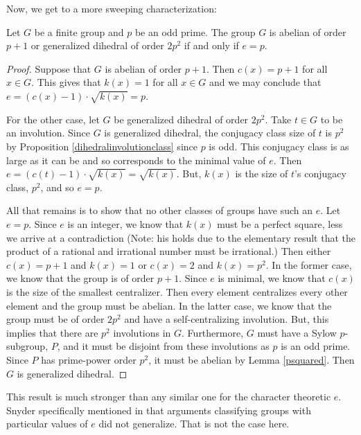 \documentclass[main.tex]{subfiles}
\begin{document}
Now, we get to a more sweeping characterization:

\begin{theorem}
Let $G$ be a finite group and $p$ be an odd prime. The group $G$ is abelian of order $p+1$ or generalized dihedral of order $2p^2$ if and only if $e = p$.
\end{theorem}

\begin{proof}
Suppose that $G$ is abelian of order $p+1$. Then $c(x) = p+1$ for all $x \in G$. This gives that $k(x) = 1$ for all $x \in G$ and we may conclude that $e = (c(x) - 1) \cdot \sqrt{k(x)} = p$.

For the other case, let $G$ be generalized dihedral of order $2p^2$. Take $t \in G$ to be an involution. Since $G$ is generalized dihedral, the conjugacy class size of $t$ is $p^2$ by Proposition \ref{dihedralinvolutionclass} since $p$ is odd. This conjugacy class is as large as it can be and so corresponds to the minimal value of $e$. Then $e = (c(t) - 1) \cdot \sqrt{k(x)} = \sqrt{k(x)}$. But, $k(x)$ is the size of $t$'s conjugacy class, $p^2$, and so $e = p$.

All that remains is to show that no other classes of groups have such an $e$. Let $e = p$. Since $e$ is an integer, we know that $k(x)$ must be a perfect square, less we arrive at a contradiction (Note: his holds due to the elementary result that the product of a rational and irrational number must be irrational.) Then either $c(x) = p+1$ and $k(x) = 1$ or $c(x) = 2$ and $k(x) = p^2$. In the former case, we know that the group is of order $p+1$. Since $e$ is minimal, we know that $c(x)$ is the size of the smallest centralizer. Then every element centralizes every other element and the group must be abelian. In the latter case, we know that the group must be of order $2p^2$ and have a self-centralizing involution. But, this implies that there are $p^2$ involutions in $G$. Furthermore, $G$ must have a Sylow $p$-subgroup, $P$, and it must be disjoint from these involutions as $p$ is an odd prime. Since $P$ has prime-power order $p^2$, it must be abelian by Lemma \ref{psquared}. Then $G$ is generalized dihedral.
\end{proof}

This result is much stronger than any similar one for the character theoretic $e$. Snyder specifically mentioned in \cite{snyderarticle} that arguments classifying groups with particular values of $e$ did not generalize. That is not the case here.

\hss
\end{document}
